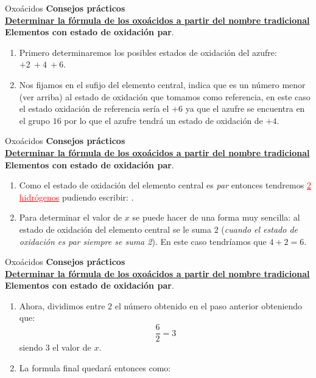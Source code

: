 \documentclass{beamer}
\newcommand*{\numberballmDarkTeal}{\protect\cnumero{\arabic*}{mDarkTeal}}
\newcommand{\examplebeamer}[1]{{\color{mLightGreen}\textbf{#1}}}
\newcommand{\alertbeamer}[1]{\alert{\textbf{#1}}}
\newcommand{\blockbeamer}[1]{{\color{mDarkTeal}\textbf{#1}}}
\newcommand{\nline}[1][6pt]{\\[#1]}
\begin{document}
\begin{frame}[t]{Oxoácidos}
    \alertbeamer{\Large Consejos prácticos}\nline{}
    \examplebeamer{\uline{Determinar la fórmula de los oxoácidos a partir del nombre tradicional}}\nline{}
    \blockbeamer{Elementos con estado de oxidación par}. 
    \begin{enumerate}[label=\numberballmDarkTeal]
        \item Primero determinaremos los posibles estados de oxidación del azufre: $+2\ +4\ +6$.
        \item Nos fijamos en el sufijo del elemento central,  indica que es un número menor (ver arriba) al estado de oxidación que tomamos como referencia, en este caso el estado oxidación de referencia sería el $+6$ ya que el azufre se encuentra en el grupo $16$ por lo que el azufre tendrá un estado de oxidación de $+4$.
    \end{enumerate}
\end{frame}

\begin{frame}[t]{Oxoácidos}
    \alertbeamer{\Large Consejos prácticos}\nline{}
    \examplebeamer{\uline{Determinar la fórmula de los oxoácidos a partir del nombre tradicional}}\nline{}
    \blockbeamer{Elementos con estado de oxidación par}. 
    \begin{enumerate}[label=\numberballmDarkTeal]
        \addtocounter{enumi}{2}
        \item Como el estado de oxidación del elemento central es \textit{par} entonces tendremos \textcolor{red}{\uline{2 hidrógenos}} pudiendo escribir: .
        \item Para determinar el valor de $x$ se puede hacer de una forma muy sencilla: al estado de oxidación del elemento central se le suma $2$ (\textit{cuando el estado de oxidación es par siempre se suma 2}). En este caso tendríamos que $4 + 2 = 6$.
    \end{enumerate}
\end{frame}

\begin{frame}[t]{Oxoácidos}
    \alertbeamer{\Large Consejos prácticos}\nline{}
    \examplebeamer{\uline{Determinar la fórmula de los oxoácidos a partir del nombre tradicional}}\nline{}
    \blockbeamer{Elementos con estado de oxidación par}. 
    \begin{enumerate}[label=\numberballmDarkTeal]
        \addtocounter{enumi}{4}
        \item Ahora, dividimos entre $2$ el número obtenido en el paso anterior obteniendo que:
              \[\frac{6}{2} = 3\]
              siendo $3$ el valor de $x$.
        \item La formula final quedará entonces como: 
    \end{enumerate}
\end{frame}
\end{document}
